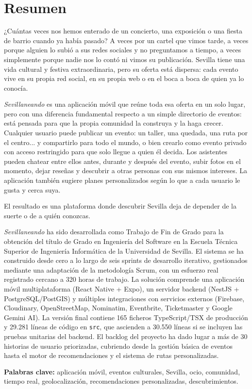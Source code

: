 \chapter*{Resumen}
¿Cuántas veces nos hemos enterado de un concierto, una exposición o una fiesta de barrio cuando ya había pasado? A veces por un cartel que vimos tarde, a veces porque alguien lo subió a sus redes sociales y no preguntamos a tiempo, a veces simplemente porque nadie nos lo contó ni vimos su publicación. Sevilla tiene una vida cultural y festiva extraordinaria, pero su oferta está dispersa: cada evento vive en su propia red social, en su propia web o en el boca a boca de quien ya lo conocía.

\textit{Sevillaneando} es una aplicación móvil que reúne toda esa oferta en un solo lugar, pero con una diferencia fundamental respecto a un simple directorio de eventos: está pensada para que la propia comunidad la construya y la haga crecer. Cualquier usuario puede publicar un evento: un taller, una quedada, una ruta por el centro... y compartirlo para todo el mundo, o bien crearlo como evento privado con acceso restringido para que solo llegue a quien él decida. Los asistentes pueden chatear entre ellos antes, durante y después del evento, subir fotos en el momento, dejar reseñas y descubrir a otras personas con sus mismos intereses. La aplicación también sugiere planes personalizados según lo que a cada usuario le gusta y cerca suya.

El resultado es una plataforma donde descubrir Sevilla deja de depender de la suerte o de a quién conozcas.

\textit{Sevillaneando} ha sido desarrollada como Trabajo de Fin de Grado para la obtención del título de Grado en Ingeniería del Software en la Escuela Técnica Superior de Ingeniería Informática de la Universidad de Sevilla. El sistema se ha construido desde cero a lo largo de seis sprints de desarrollo iterativo, gestionados mediante una adaptación de la metodología Scrum, con un esfuerzo real registrado cercano a 320 horas de trabajo. La solución comprende una aplicación móvil multiplataforma (React Native + Expo), un servidor backend (NestJS + PostgreSQL/PostGIS) y múltiples integraciones con servicios externos (Firebase, Cloudinary, OpenStreetMap, Nominatim, Eventbrite, Ticketmaster y Google Gemini AI). La versión final contiene 165 ficheros TypeScript/TSX de producción y 29.281 líneas de código en \texttt{src}, que ascienden a 30.550 líneas si se incluyen las pruebas unitarias del backend. El backlog del proyecto ha dado lugar a más de 30 historias de usuario priorizadas, cubriendo desde la gestión básica de eventos hasta el motor de recomendaciones y el sistema de rutas personalizadas.

\vspace{.5cm}

\textbf{Palabras clave:} aplicación móvil, eventos culturales, Sevilla, ocio, comunidad, tiempo real, geolocalización, recomendaciones personalizadas, descubrimientos.
